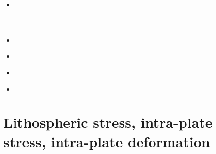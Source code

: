 \begin{small}
\begin{itemize}
 \\
 \\
 \\
 \\
 \\
\item[\twothousandtwenty] 
 \\
 \\
 \\
\item[\twothousandtwentyone] 
\item[\twothousandtwentytwo] 
 \\
\item[\twothousandtwentythree] 
\item[\twothousandtwentyfour] 
 \\
\end{itemize}
\end{small}

\section{Lithospheric stress, intra-plate stress, intra-plate deformation}

